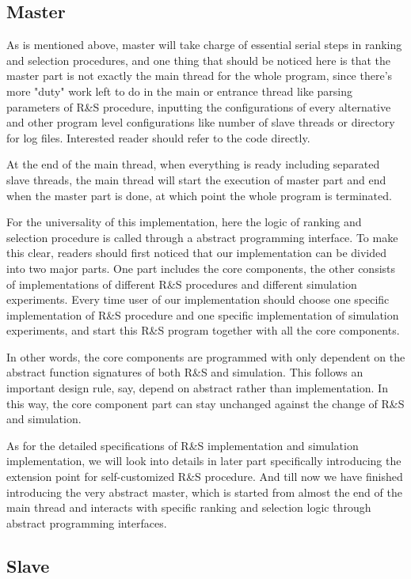 \documentclass[12pt,a4paper]{report}
\begin{document}
\subsection{Master}

As is mentioned above, master will take charge of essential serial steps in ranking and selection procedures, and one thing that should be noticed here is that the master part is not exactly the main thread for the whole program, since there's more "duty" work left to do in the main or entrance thread like parsing parameters of R\&S procedure, inputting the configurations of every alternative and other program level configurations like number of slave threads or directory for log files. Interested reader should refer to the code directly.

At the end of the main thread, when everything is ready including separated slave threads, the main thread will start the execution of master part and end when the master part is done, at which point the whole program is terminated.

For the universality of this implementation, here the logic of ranking and selection procedure is called through a abstract programming interface. To make this clear, readers should first noticed that our implementation can be divided into two major parts. One part includes the core components, the other consists of implementations of different R\&S procedures and different simulation experiments. Every time user of our implementation should choose one specific implementation of R\&S procedure and one specific implementation of simulation experiments, and start this R\&S program together with all the core components.

In other words, the core components are programmed with only dependent on the abstract function signatures of both R\&S and simulation. This follows an important design rule, say, depend on abstract rather than implementation. In this way, the core component part can stay unchanged against the change of R\&S and simulation.

As for the detailed specifications of R\&S implementation and simulation implementation, we will look into details in later part specifically introducing the extension point for self-customized R\&S procedure. And till now we have finished introducing the very abstract master, which is started from almost the end of the main thread and interacts with specific ranking and selection logic through abstract programming interfaces.

\subsection{Slave}
\end{document}
